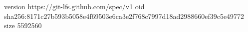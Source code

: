 version https://git-lfs.github.com/spec/v1
oid sha256:8171c27b593b5058e4f69503e6ca3e2f768c7997d18ad2988660ef39c5e49772
size 5592560
